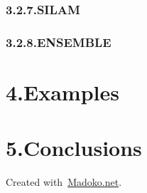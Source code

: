 \documentclass[9pt]{report}
\begin{document}
\subsubsection{3.2.7.\hspace*{0.5em}SILAM}\label{sec-silam}%

\subsubsection{3.2.8.\hspace*{0.5em}ENSEMBLE}\label{sec-ensemble}%

\section{4.\hspace*{0.5em}Examples}\label{sec-examples}%

\section{5.\hspace*{0.5em}Conclusions}\label{sec-conclusions}%

\begin{mdbmargintb}{4em}{}%
\begin{mdflushright}%
{\tiny{}Created with~\href{https://www.madoko.net}{Madoko.net}.}%
\end{mdflushright}%
\end{mdbmargintb}%
\end{document}
